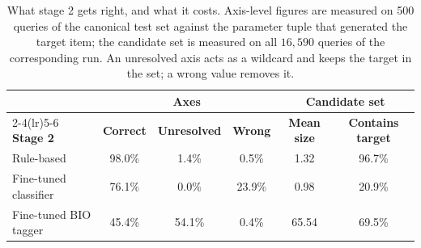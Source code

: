 \begin{table}[ht]
\centering
\caption{What stage 2 gets right, and what it costs. Axis-level figures are measured on 500 queries of the canonical test set against the parameter tuple that generated the target item; the candidate set is measured on all $16{,}590$ queries of the corresponding run. An unresolved axis acts as a wildcard and keeps the target in the set; a wrong value removes it.}
\label{tab:stage2}
\begin{tabular}{lccccc}
\toprule
 & \multicolumn{3}{c}{\textbf{Axes}} & \multicolumn{2}{c}{\textbf{Candidate set}} \\
\cmidrule(lr){2-4}\cmidrule(lr){5-6}
\textbf{Stage 2} & \textbf{Correct} & \textbf{Unresolved} & \textbf{Wrong} & \textbf{Mean size} & \textbf{Contains target} \\
\midrule
Rule-based & 98.0\% & 1.4\% & 0.5\% & 1.32 & 96.7\% \\
Fine-tuned classifier & 76.1\% & 0.0\% & 23.9\% & 0.98 & 20.9\% \\
Fine-tuned BIO tagger & 45.4\% & 54.1\% & 0.4\% & 65.54 & 69.5\% \\
\bottomrule
\end{tabular}
\end{table}
